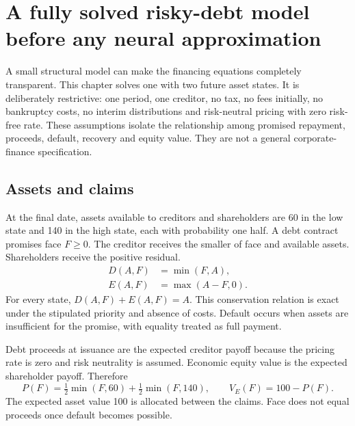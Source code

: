 \chapter[A fully solved risky-debt model]{A fully solved risky-debt model before any neural approximation}
\label{sim:finite-finance}

A small structural model can make the financing equations completely transparent. This chapter solves one with two future asset states. It is deliberately restrictive: one period, one creditor, no tax, no fees initially, no bankruptcy costs, no interim distributions and risk-neutral pricing with zero risk-free rate. These assumptions isolate the relationship among promised repayment, proceeds, default, recovery and equity value. They are not a general corporate-finance specification.

\section{Assets and claims}
At the final date, assets available to creditors and shareholders are 60 in the low state and 140 in the high state, each with probability one half. A debt contract promises face $F\geq0$. The creditor receives the smaller of face and available assets. Shareholders receive the positive residual.
\begin{align}
 D(A,F)&=\min(F,A),\\
 E(A,F)&=\max(A-F,0).
\end{align}
For every state, $D(A,F)+E(A,F)=A$. This conservation relation is exact under the stipulated priority and absence of costs. Default occurs when assets are insufficient for the promise, with equality treated as full payment.

Debt proceeds at issuance are the expected creditor payoff because the pricing rate is zero and risk neutrality is assumed. Economic equity value is the expected shareholder payoff. Therefore
\begin{equation}
 P(F)=\tfrac12\min(F,60)+\tfrac12\min(F,140),\qquad V_E(F)=100-P(F).
\end{equation}
The expected asset value 100 is allocated between the claims. Face does not equal proceeds once default becomes possible.

